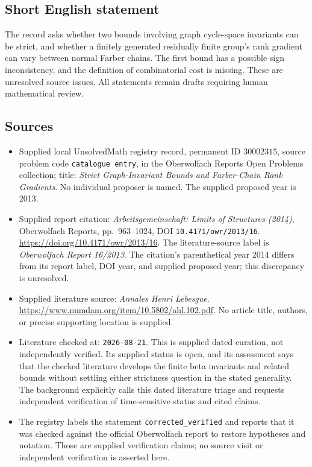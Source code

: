 \documentclass[11pt]{article}
\begin{document}
\subsection{Short English statement}
The record asks whether two bounds involving graph cycle-space invariants can be strict, and whether a finitely generated residually finite group's rank gradient can vary between normal Farber chains. The first bound has a possible sign inconsistency, and the definition of combinatorial cost is missing. These are unresolved source issues. All statements remain drafts requiring human mathematical review.
\subsection{Sources}
\begin{itemize}
\item Supplied local UnsolvedMath registry record, permanent ID \(30002315\), source problem code \texttt{catalogue entry}, in the Oberwolfach Reports Open Problems collection; title: \emph{Strict Graph-Invariant Bounds and Farber-Chain Rank Gradients}. No individual proposer is named. The supplied proposed year is 2013.
\item Supplied report citation: \emph{Arbeitsgemeinschaft: Limits of Structures (2014)}, Oberwolfach Reports, pp.\ 963--1024, DOI \texttt{10.4171/owr/2013/16}. \url{https://doi.org/10.4171/owr/2013/16}. The literature-source label is \emph{Oberwolfach Report 16/2013}. The citation's parenthetical year 2014 differs from its report label, DOI year, and supplied proposed year; this discrepancy is unresolved.
\item Supplied literature source: \emph{Annales Henri Lebesgue}. \url{https://www.numdam.org/item/10.5802/ahl.102.pdf}. No article title, authors, or precise supporting location is supplied.
\item Literature checked at: \texttt{2026-08-21}. This is supplied dated curation, not independently verified. Its supplied status is open, and its assessment says that the checked literature develops the finite beta invariants and related bounds without settling either strictness question in the stated generality. The background explicitly calls this dated literature triage and requests independent verification of time-sensitive status and cited claims.
\item The registry labels the statement \texttt{corrected\_verified} and reports that it was checked against the official Oberwolfach report to restore hypotheses and notation. Those are supplied verification claims; no source visit or independent verification is asserted here.
\end{itemize}
\end{document}
